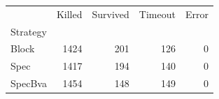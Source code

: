 \begin{tabular}{lrrrr}
\toprule
 & Killed & Survived & Timeout & Error \\
Strategy &  &  &  &  \\
\midrule
Block & 1424 & 201 & 126 & 0 \\
Spec & 1417 & 194 & 140 & 0 \\
SpecBva & 1454 & 148 & 149 & 0 \\
\bottomrule
\end{tabular}
